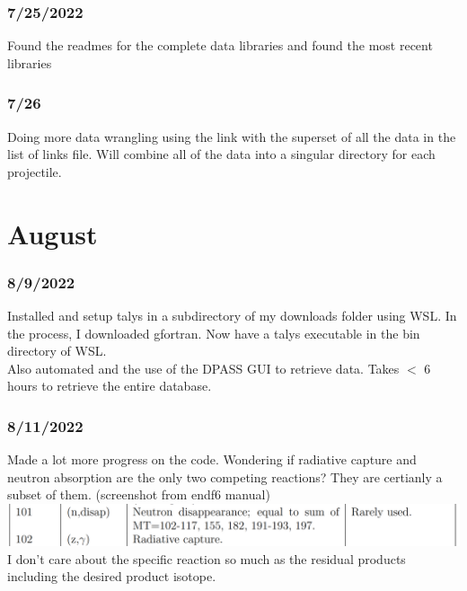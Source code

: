 \documentclass[12pt]{article}
\begin{document}
\subsubsection{7/25/2022}
Found the readmes for the complete data libraries and found the most recent libraries \\
\subsubsection{7/26}
Doing more data wrangling using the link with the superset of all the data in the list of links file. Will combine all of the data into a singular directory for each projectile. 
\section{August}
\subsubsection{8/9/2022}
Installed and setup talys in a subdirectory of my downloads folder using WSL. In the process, I downloaded gfortran. Now have a talys executable in the bin directory of WSL. \\
Also automated and the use of the DPASS GUI to retrieve data. Takes $<$ 6 hours to retrieve the entire database. \\

\subsubsection{8/11/2022}
Made a lot more progress on the code. Wondering if radiative capture and neutron absorption are the only two competing reactions? They are certianly a subset of them. (screenshot from endf6 manual) \\
\includegraphics[scale=.4]{Images/are these the only two competing reactions.PNG}\\
I don't care about the specific reaction so much as the residual products including the desired product isotope. 
\end{document}
